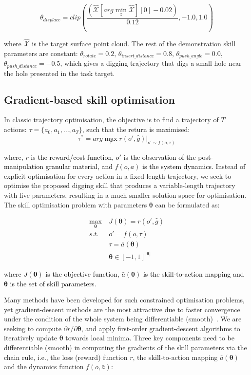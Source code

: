 \documentclass[letterpaper, 10 pt, journal, twoside]{ieeetran}
\newcommand{\rp}[1]{\textcolor{black}{#1}}
\begin{document}
$$\theta_{displace} = clip(\frac{(\pmb{\hat{\mathcal{X}}}[arg\min_z\pmb{\hat{\mathcal{X}}}][0] - 0.02)}{0.12}, -1.0, 1.0)$$

\noindent where $\pmb{\hat{\mathcal{X}}}$ is the target surface point cloud. The rest of the demonstration skill parameters are constant: $\theta_{rotate}=0.2$, $\theta_{insert\_distance}=0.8$, $\theta_{push\_angle}=0.0$, $\theta_{push\_distance}=-0.5$, which gives a digging trajectory that digs a small hole near the hole presented in the task target.

\subsection{Gradient-based skill optimisation}
In classic trajectory optimisation, the objective is to find a trajectory of $T$ actions: $\tau=\{a_0, a_1, ..., a_T\}$, such that the return is maximised: 
$$\tau^* = arg\max_{\tau}r(o',\hat{g})|_{o'\sim f(o, \tau)}$$

\noindent \rp{where, $r$ is the reward/cost function, $o'$ is the observation of the post-manipulation granular material, and $f(o, a)$ is the system dynamics.} Instead of explicit optimisation for every action in a fixed-length trajectory, we seek to optimise the proposed digging skill that produces a variable-length trajectory with five parameters, resulting in a much smaller solution space for optimisation. The skill optimisation problem with parameters $\pmb{\theta}$ can be formulated as: 

\begin{equation*}
\begin{split}
\max_{\pmb{\theta}} \ & J(\pmb{\theta}) = r(o',\hat{g})\\
s.t. \ & o' = f(o, \tau) \\
& \tau = \bar{a}(\pmb{\theta})\\
& \pmb{\theta} \in [-1, 1]^{|\pmb{\theta}|}
\end{split}
\end{equation*}

\noindent \rp{where $J(\pmb{\theta})$ is the objective function, $\bar{a}(\pmb{\theta})$ is the skill-to-action mapping and $\pmb{\theta}$ is the set of skill parameters.} 

Many methods have been developed for such constrained optimisation problems, yet gradient-descent methods are the most attractive due to faster convergence under the condition of the whole system being differentiable (smooth)~\cite{bonnans2006numerical}. We are seeking to compute $\partial r/\partial\pmb{\theta}$, and apply first-order gradient-descent algorithms to iteratively update $\pmb{\theta}$ towards local minima.
Three key components need to be differentiable (smooth) in computing the gradients of the skill parameters via the chain rule, i.e., the loss (reward) function $r$, the skill-to-action mapping $\bar{a}(\pmb{\theta})$ and the dynamics function $f(o,\bar{a})$:
\end{document}
